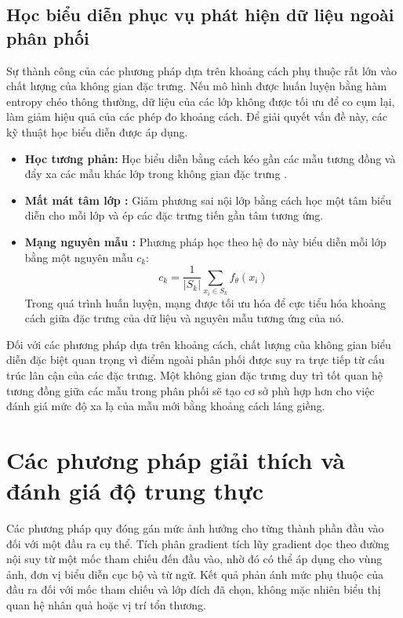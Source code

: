 \subsection{Học biểu diễn phục vụ phát hiện dữ liệu ngoài phân phối}
Sự thành công của các phương pháp dựa trên khoảng cách phụ thuộc rất lớn vào chất lượng của không gian đặc trưng. Nếu mô hình được huấn luyện bằng hàm entropy chéo thông thường, dữ liệu của các lớp không được tối ưu để co cụm lại, làm giảm hiệu quả của các phép đo khoảng cách. Để giải quyết vấn đề này, các kỹ thuật học biểu diễn được áp dụng.
\pagebreak
\begin{itemize}
    \item \textbf{Học tương phản:} Học biểu diễn bằng cách kéo gần các mẫu tương đồng và đẩy xa các mẫu khác lớp trong không gian đặc trưng \cite{Chen2020SimCLR,He2020MoCo}.
    \item \textbf{Mất mát tâm lớp \cite{CenterLoss}:} Giảm phương sai nội lớp bằng cách học một tâm biểu diễn cho mỗi lớp và ép các đặc trưng tiến gần tâm tương ứng.
    \item \textbf{Mạng nguyên mẫu \cite{Snell2017ProtoNet}:} Phương pháp học theo hệ đo này biểu diễn mỗi lớp bằng một nguyên mẫu $c_k$:
    \begin{equation}
    c_k = \frac{1}{|S_k|}\sum_{x_i\in S_k}f_\theta(x_i)
    \label{eq:protonet}
    \end{equation}
    Trong quá trình huấn luyện, mạng được tối ưu hóa để cực tiểu hóa khoảng cách giữa đặc trưng của dữ liệu và nguyên mẫu tương ứng của nó.
\end{itemize}

Đối với các phương pháp dựa trên khoảng cách, chất lượng của không gian biểu diễn đặc biệt quan trọng vì điểm ngoài phân phối được suy ra trực tiếp từ cấu trúc lân cận của các đặc trưng. Một không gian đặc trưng duy trì tốt quan hệ tương đồng giữa các mẫu trong phân phối sẽ tạo cơ sở phù hợp hơn cho việc đánh giá mức độ xa lạ của mẫu mới bằng khoảng cách láng giềng.
\pagebreak
\section{Các phương pháp giải thích và đánh giá độ trung thực}

Các phương pháp quy đóng gán mức ảnh hưởng cho từng thành phần đầu vào đối với một đầu ra cụ thể. Tích phân gradient \cite{Sundararajan2017IntegratedGradients} tích lũy gradient dọc theo đường nội suy từ một mốc tham chiếu đến đầu vào, nhờ đó có thể áp dụng cho vùng ảnh, đơn vị biểu diễn cục bộ và từ ngữ. Kết quả phản ánh mức phụ thuộc của đầu ra đối với mốc tham chiếu và lớp đích đã chọn, không mặc nhiên biểu thị quan hệ nhân quả hoặc vị trí tổn thương.

